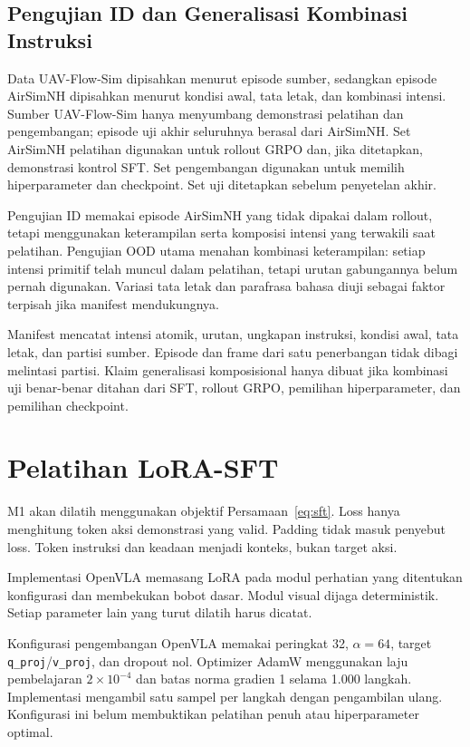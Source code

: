 \subsection{Pengujian ID dan Generalisasi Kombinasi Instruksi}
\label{subsec:split_generalisasi}
Data UAV-Flow-Sim dipisahkan menurut episode sumber, sedangkan episode AirSimNH dipisahkan menurut kondisi awal, tata letak, dan kombinasi intensi. Sumber UAV-Flow-Sim hanya menyumbang demonstrasi pelatihan dan pengembangan; episode uji akhir seluruhnya berasal dari AirSimNH. Set AirSimNH pelatihan digunakan untuk rollout GRPO dan, jika ditetapkan, demonstrasi kontrol SFT. Set pengembangan digunakan untuk memilih hiperparameter dan checkpoint. Set uji ditetapkan sebelum penyetelan akhir.

Pengujian ID memakai episode AirSimNH yang tidak dipakai dalam rollout, tetapi menggunakan keterampilan serta komposisi intensi yang terwakili saat pelatihan. Pengujian OOD utama menahan kombinasi keterampilan: setiap intensi primitif telah muncul dalam pelatihan, tetapi urutan gabungannya belum pernah digunakan. Variasi tata letak dan parafrasa bahasa diuji sebagai faktor terpisah jika manifest mendukungnya.

Manifest mencatat intensi atomik, urutan, ungkapan instruksi, kondisi awal, tata letak, dan partisi sumber. Episode dan frame dari satu penerbangan tidak dibagi melintasi partisi. Klaim generalisasi komposisional hanya dibuat jika kombinasi uji benar-benar ditahan dari SFT, rollout GRPO, pemilihan hiperparameter, dan pemilihan checkpoint.

\section{Pelatihan LoRA-SFT}
\label{sec:lora_training}
M1 akan dilatih menggunakan objektif Persamaan~\ref{eq:sft}. Loss hanya menghitung token aksi demonstrasi yang valid. Padding tidak masuk penyebut loss. Token instruksi dan keadaan menjadi konteks, bukan target aksi.

Implementasi OpenVLA memasang LoRA pada modul perhatian yang ditentukan konfigurasi dan membekukan bobot dasar. Modul visual dijaga deterministik. Setiap parameter lain yang turut dilatih harus dicatat.

Konfigurasi pengembangan OpenVLA memakai peringkat 32, $\alpha=64$, target \texttt{q\_proj}/\texttt{v\_proj}, dan dropout nol. Optimizer AdamW menggunakan laju pembelajaran $2\times10^{-4}$ dan batas norma gradien 1 selama 1.000 langkah. Implementasi mengambil satu sampel per langkah dengan pengambilan ulang. Konfigurasi ini belum membuktikan pelatihan penuh atau hiperparameter optimal.

